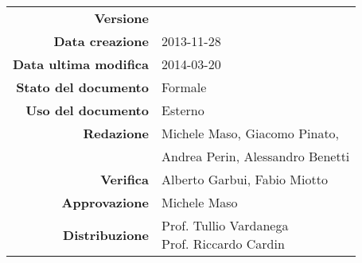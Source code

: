 

\newcommand{\Versione}{\versioneGlossario{}}
\newcommand{\Data}{2013-11-28}
\newcommand{\DataUltimaModifica}{2014-03-20}
\newcommand{\TipoDocumento}{Glossario}
\newcommand{\Lettera}[1]{\huge #1}
\newcommand{\Riga}{\\\rule[2mm]{\textwidth}{0.25mm}}
\newcommand{\Termine}{\emph}
\newcommand{\Inizio}{}

\newcommand{\paginaGlossario}[1]{
\newpage
\setcounter{secnumdepth}{0} %
\section{\Lettera{#1}}
}

\newcommand{\elemento}[2]{
\setcounter{secnumdepth}{0} %
\subsection{#1}
\begin{quote}
{#2}
\end{quote}
}



\begin{center}

\begin{tabular}{r|l}
\textbf{Versione} & \Versione\\
\textbf{Data creazione} & \Data \\
\textbf{Data ultima modifica} & \DataUltimaModifica \\
\textbf{Stato del documento} & Formale \\
\textbf{Uso del documento} & Esterno \\
\textbf{Redazione} & Michele Maso, Giacomo Pinato,\\
                   & Andrea Perin, Alessandro Benetti\\
\textbf{Verifica} & Alberto Garbui, Fabio Miotto \\
\textbf{Approvazione} & Michele Maso \\
\textbf{Distribuzione} & \parbox[t]{4cm}{Prof. Tullio Vardanega \\ Prof. Riccardo Cardin \\ \Prop{} } \\
\end{tabular}
\end{center}
\vspace{.01in}

